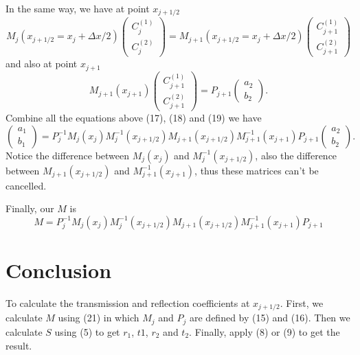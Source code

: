 \documentclass[12pt]{article}       %
\begin{document}
In the same way, we have at point $x_{j+1/2}$
\begin{equation}
    M_j(x_{j+1/2}=x_j+\Delta x/2)   \left(\begin{matrix}
        C_j^{(1)} \\
        C_j^{(2)}
    \end{matrix}\right)
    =
    M_{j+1}(x_{j+1/2}=x_j+\Delta x/2)
    \left(\begin{matrix}
        C_{j+1}^{(1)} \\
        C_{j+1}^{(2)}
    \end{matrix}\right) 
\end{equation}
and also at point $x_{j+1}$
\begin{equation}
        M_{j+1}(x_{j+1})
    \left(\begin{matrix}
        C_{j+1}^{(1)} \\
        C_{j+1}^{(2)}
    \end{matrix}\right) 
    = P_{j+1}
    \left(\begin{matrix}
        a_2 \\
        b_2
    \end{matrix}\right).
\end{equation}
Combine all the equations above (17), (18) and (19) we have
\begin{equation}
        \left(\begin{matrix}
        a_1 \\
        b_1
    \end{matrix}\right)
    =
    P_j^{-1}M_j(x_j)M_j^{-1}(x_{j+1/2})M_{j+1}(x_{j+1/2})M_{j+1}^{-1}(x_{j+1})P_{j+1}
        \left(\begin{matrix}
        a_2 \\
        b_2
    \end{matrix}\right).
\end{equation}
Notice the difference between $M_j(x_j)$ and $M^{-1}_j(x_{j+1/2})$, also the difference between $M_{j+1}(x_{j+1/2})$ and $M^{-1}_{j+1}(x_{j+1})$, thus these matrices can't be cancelled.

Finally, our $M$ is 
\begin{equation}
    M = P_j^{-1}M_j(x_j)M_j^{-1}(x_{j+1/2})M_{j+1}(x_{j+1/2})M_{j+1}^{-1}(x_{j+1})P_{j+1}
\end{equation}

\section{Conclusion}

To calculate the transmission and reflection coefficients at $x_{j+1/2}$. First, we calculate $M$ using (21) in which $M_{j}$ and $P_j$ are defined by (15) and (16). Then we calculate $S$ using (5) to get $r_1$, $t1$, $r_2$ and $t_2$. Finally, apply (8) or (9) to get the result.
\end{document}
